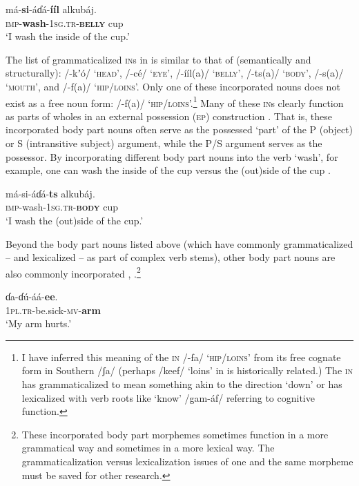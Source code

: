 \documentclass[output=paper]{langsci/langscibook}
\begin{document}
\ea\label{ex:ahlandc:11}
\gll 
má-\textbf{si}{}-áɗá-\textbf{ííl}  alkubáj. \\
\textsc{imp}{}-\textbf{wash}{}-\textsc{1sg.tr-}\textbf{\textsc{belly}}     cup \\
\glt
‘I wash the inside of the cup.’
\z

The list of grammaticalized \textsc{in}s in  is  similar to that of  (semantically and structurally): /-kʼ\'{o}/ ‘\textsc{head}’, /-cé/ ‘\textsc{eye}’, /-ííl(a)/ ‘\textsc{belly}’, /-ts(a)/ ‘\textsc{body}’, /-s(a)/ ‘\textsc{mouth}’, and /-f(a)/ ‘\textsc{hip/loins}’. Only one of these incorporated nouns does not exist as a free noun form: /-f(a)/ ‘\textsc{hip/loins}’.\footnote{ I have inferred this meaning of the \textsc{in }/-fa/ ‘\textsc{hip/loins}’ from its free cognate form in Southern  /ʃa/ (perhaps /keef/ ‘loins’ in  is historically related.) The \textsc{in} has grammaticalized to mean something akin to the direction ‘down’ or has lexicalized with verb roots like ‘know’ /gam-áf/ referring to cognitive function.} Many of these \textsc{in}s clearly function as parts of wholes in an external possession (\textsc{ep}) construction \citep{PayneBarshi1999}. That is, these incorporated body part nouns often serve as the possessed ‘part’ of the P (object) or S (intransitive subject) argument, while the P/S argument serves as the possessor. By incorporating different body part nouns into the verb ‘wash’, for example, one can wash the inside of the cup  versus the (out)side of the cup .  

\ea\label{ex:ahlandc:12}
\gll
má-si-áɗá-\textbf{ts}    alkubáj. \\
\textsc{imp}{}-wash{}-\textsc{1sg.tr-}\textbf{\textsc{body}}   cup \\
\glt
‘I wash the (out)side of the cup.’
\z

Beyond the body part nouns listed above (which have commonly grammaticalized – and lexicalized – as part of complex verb stems), other body part nouns are also commonly incorporated , .\footnote{These incorporated body part morphemes sometimes function in a more grammatical way and sometimes in a more lexical way. The grammaticalization versus lexicalization issues of one and the same morpheme must be saved for other research.}

\ea\label{ex:ahlandc:13}
\gll
ɗa-ɗ\'{u}-áá-\textbf{ee}.   \\
\textsc{1pl.tr}{}-be.sick-\textsc{mv}{}-\textbf{arm} \\
\glt
‘My arm hurts.’
\z
\end{document}
